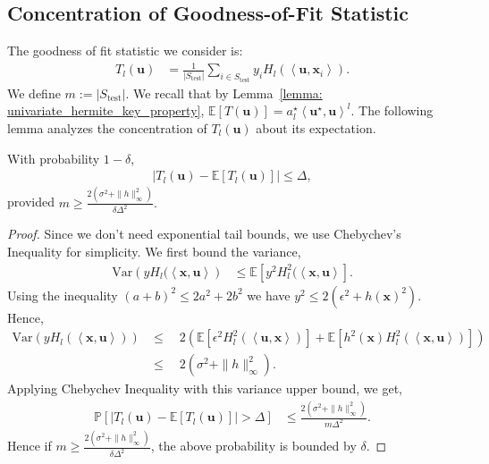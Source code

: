 \documentclass[final,12pt]{colt2018} %
\newcommand{\E}{\mathbb{E}}
\newcommand{\Prob}{\mathbb{P}}
\newcommand{\var}[1]{ \text{Var} \left( #1 \right)}
\renewcommand\v[1]{{\ensuremath{\boldsymbol{#1}}}}
\newcommand\ip[1]{\left\langle #1 \right\rangle}
\begin{document}
\subsection{Concentration of Goodness-of-Fit Statistic}
The goodness of fit statistic we consider is:
\begin{align*}
    T_l(\v u) & = \frac{1}{|S_{\text{test}}|} \sum_{i \in S_\text{test}} y_i H_l(\ip{\v u, \v x_i}).
\end{align*}
We define $m:=|S_{\text{test}}|$. 
We recall that by Lemma~\ref{lemma: univariate_hermite_key_property}, $\E[T(\v u)] = a_l^\star \ip{\v u^\star, \v u}^l$.
The following lemma analyzes the concentration of $T_l(\v u)$ about its expectation. 

\begin{lemma} With probability $1-\delta$,
\begin{align*}
| T_l(\v u) - \E[T_l(\v u)] | \leq \Delta,
\end{align*}
provided $m \geq \frac{2(\sigma^2 + \|h\|_\infty^2)}{\delta \Delta^2}.$
\label{lemma: concentration_goodness_of_fit}
\end{lemma}
\begin{proof}
Since we don't need exponential tail bounds, we use Chebychev's Inequality for simplicity. We first bound the variance,
\begin{align*}
    \var{y H_l(\ip{\v x, \v u}} & \leq \E \left[ y^2 H_l^2(\ip{\v x, \v u} \right].
\end{align*}
Using the inequality $(a+b)^2 \leq 2 a^2 + 2 b^2$ we have $y^2 \leq 2(\epsilon^2 + h(\v x)^2)$. Hence,
\begin{align*}
    \var{y H_l(\ip{\v x, \v u})} &\leq \quad 2 \left( \E \left[\epsilon^2 H_l^2(\ip{\v u,\v x})\right] + \E \left[ h^2(\v x) H_l^2(\ip{\v x,\v u})\right]\right) \\
    & \leq \quad 2 \left( \sigma^2 + \|h\|_\infty^2 \right).
\end{align*}
Applying Chebychev Inequality with this variance upper bound, we get,
\begin{align*}
    \Prob \left[ | T_l(\v u) - \E[T_l(\v u)] | > \Delta \right] & \leq \frac{2(\sigma^2 + \|h\|_\infty^2)}{m \Delta^2}.
\end{align*}
Hence if $m \geq \frac{2(\sigma^2 + \|h\|_\infty^2)}{\delta \Delta^2}$, the above probability is bounded by $\delta$. 
\end{proof}
\end{document}
